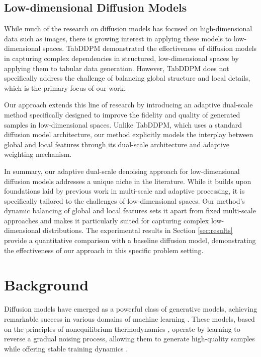 \documentclass{article} %
\begin{document}
\subsection{Low-dimensional Diffusion Models}
While much of the research on diffusion models has focused on high-dimensional data such as images, there is growing interest in applying these models to low-dimensional spaces. TabDDPM \cite{Kotelnikov2022TabDDPMMT} demonstrated the effectiveness of diffusion models in capturing complex dependencies in structured, low-dimensional spaces by applying them to tabular data generation. However, TabDDPM does not specifically address the challenge of balancing global structure and local details, which is the primary focus of our work.

Our approach extends this line of research by introducing an adaptive dual-scale method specifically designed to improve the fidelity and quality of generated samples in low-dimensional spaces. Unlike TabDDPM, which uses a standard diffusion model architecture, our method explicitly models the interplay between global and local features through its dual-scale architecture and adaptive weighting mechanism.

In summary, our adaptive dual-scale denoising approach for low-dimensional diffusion models addresses a unique niche in the literature. While it builds upon foundations laid by previous work in multi-scale and adaptive processing, it is specifically tailored to the challenges of low-dimensional spaces. Our method's dynamic balancing of global and local features sets it apart from fixed multi-scale approaches and makes it particularly suited for capturing complex low-dimensional distributions. The experimental results in Section \ref{sec:results} provide a quantitative comparison with a baseline diffusion model, demonstrating the effectiveness of our approach in this specific problem setting.

\section{Background}
\label{sec:background}

Diffusion models have emerged as a powerful class of generative models, achieving remarkable success in various domains of machine learning \cite{yang2023diffusion}. These models, based on the principles of nonequilibrium thermodynamics \cite{pmlr-v37-sohl-dickstein15}, operate by learning to reverse a gradual noising process, allowing them to generate high-quality samples while offering stable training dynamics \cite{ddpm}.
\end{document}

